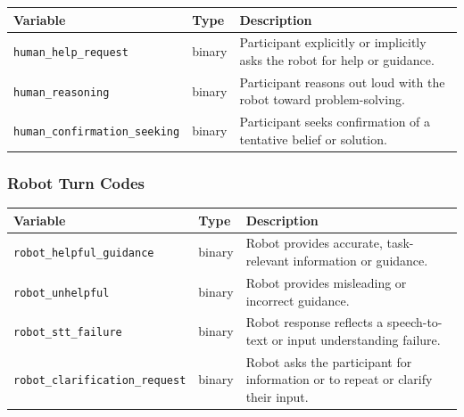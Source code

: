 \documentclass[
  letterpaper,
  DIV=11,
  numbers=noendperiod]{scrartcl}
\begin{document}
\begin{longtable}[]{@{}
  >{\raggedright\arraybackslash}p{}
  >{\raggedright\arraybackslash}p{}
  >{\raggedright\arraybackslash}p{}@{}}
\toprule\noalign{}
\begin{minipage}[b]{\linewidth}\raggedright
Variable
\end{minipage} & \begin{minipage}[b]{\linewidth}\raggedright
Type
\end{minipage} & \begin{minipage}[b]{\linewidth}\raggedright
Description
\end{minipage} \\
\midrule\noalign{}
\endhead
\bottomrule\noalign{}
\endlastfoot
\texttt{human\_help\_request} & binary & Participant explicitly or
implicitly asks the robot for help or guidance. \\
\texttt{human\_reasoning} & binary & Participant reasons out loud with
the robot toward problem-solving. \\
\texttt{human\_confirmation\_seeking} & binary & Participant seeks
confirmation of a tentative belief or solution. \\
\end{longtable}

\subsubsection*{Robot Turn Codes}\label{robot-turn-codes}

\begin{longtable}[]{@{}
  >{\raggedright\arraybackslash}p{}
  >{\raggedright\arraybackslash}p{}
  >{\raggedright\arraybackslash}p{}@{}}
\toprule\noalign{}
\begin{minipage}[b]{\linewidth}\raggedright
Variable
\end{minipage} & \begin{minipage}[b]{\linewidth}\raggedright
Type
\end{minipage} & \begin{minipage}[b]{\linewidth}\raggedright
Description
\end{minipage} \\
\midrule\noalign{}
\endhead
\bottomrule\noalign{}
\endlastfoot
\texttt{robot\_helpful\_guidance} & binary & Robot provides accurate,
task-relevant information or guidance. \\
\texttt{robot\_unhelpful} & binary & Robot provides misleading or
incorrect guidance. \\
\texttt{robot\_stt\_failure} & binary & Robot response reflects a
speech-to-text or input understanding failure. \\
\texttt{robot\_clarification\_request} & binary & Robot asks the
participant for information or to repeat or clarify their input. \\
\end{longtable}
\end{document}
